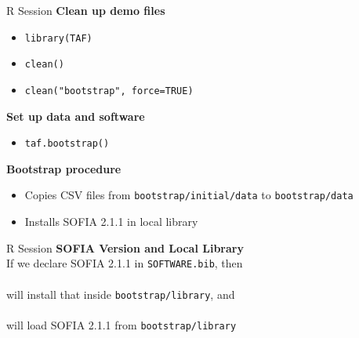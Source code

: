 \documentclass[aspectratio=169]{beamer}
\begin{document}

\begin{frame}[fragile]{R Session}
  \textbf{\darkgreen Clean up demo files}
  \begin{itemize}
    \item[] \verb|library(TAF)|\\[0.5ex]
    \item[] \verb|clean()|\\[0.5ex]
    \item[] \verb|clean("bootstrap", force=TRUE)|\\[1ex]
  \end{itemize}
  \vspace{2ex}
  \textbf{\darkgreen Set up data and software}
  \begin{itemize}
    \item[] \verb|taf.bootstrap()|\\[1ex]
  \end{itemize}
  \vspace{2ex}
  \textbf{\darkgreen Bootstrap procedure}\\[0.3ex]
  \begin{itemize}
    \item[] Copies CSV files from \verb|bootstrap/initial/data| to
    \verb|bootstrap/data|\\[1.2ex]
    \item[] Installs SOFIA 2.1.1 in local library\\[1ex]
  \end{itemize}
\end{frame}


\begin{frame}{R Session}
  \textbf{\darkgreen SOFIA Version and Local Library}\\[1.5ex]
  If we declare SOFIA 2.1.1 in {\tt SOFTWARE.bib}, then\\[0.8ex]
  \\[0.8ex]
  will {\darkgreen install} that inside {\tt bootstrap/library}, and\\[0.8ex]
  \\[0.8ex]
  will {\darkgreen load} SOFIA 2.1.1 from {\tt bootstrap/library}
\end{frame}

\end{document}
